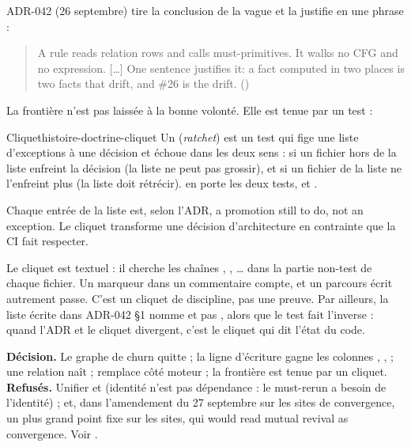 ADR-042 (26 septembre) tire la conclusion de la vague et la justifie en une phrase :

\begin{quote}\small
\og A rule reads relation rows and calls must-primitives. It walks no CFG and no expression. [\dots] One sentence justifies it: a fact computed in two places is two facts that drift, and \#26 is the drift.\fg{} ()
\end{quote}

La frontière n'est pas laissée à la bonne volonté. Elle est tenue par un test :


\begin{definition}{Cliquet}{histoire-doctrine-cliquet}
Un  (\emph{ratchet}) est un test qui fige une liste d'exceptions à une décision et échoue dans les deux sens : si un fichier hors de la liste enfreint la décision (la liste ne peut pas grossir), et si un fichier de la liste ne l'enfreint plus (la liste doit rétrécir).  en porte les deux tests,  et .
\end{definition}

Chaque entrée de la liste est, selon l'ADR, \og a promotion still to do, not an exception\fg{}. Le cliquet transforme une décision d'architecture en contrainte que la CI fait respecter.

\begin{piege}
Le cliquet est textuel : il cherche les chaînes , , \dots{} dans la partie non-test de chaque fichier. Un marqueur dans un commentaire compte, et un parcours écrit autrement passe. C'est un cliquet de discipline, pas une preuve. Par ailleurs, la liste écrite dans ADR-042 §1 nomme  et pas , alors que le test fait l'inverse : quand l'ADR et le cliquet divergent, c'est le cliquet qui dit l'état du code.
\end{piege}

\begin{decision}
\textbf{Décision.} Le graphe de churn quitte  ; la ligne d'écriture gagne les colonnes , ,  ; une relation  naît ;  remplace  côté moteur ; la frontière est tenue par un cliquet. \textbf{Refusés.} Unifier  et  (identité n'est pas dépendance : le must-rerun a besoin de l'identité) ; et, dans l'amendement du 27 septembre sur les sites de convergence, un plus grand point fixe sur les sites, qui \og would read mutual revival as convergence\fg{}. Voir .
\end{decision}

